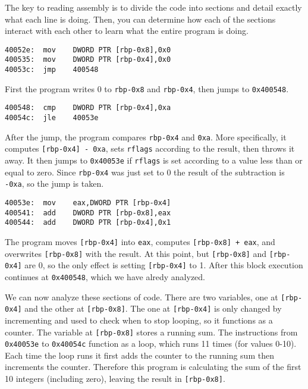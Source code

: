 The key to reading assembly is to divide the code into sections and detail
exactly what each line is doing. Then, you can determine how each of the
sections interact with each other to learn what the entire program is doing.

\begin{lstlisting}
40052e:  mov    DWORD PTR [rbp-0x8],0x0
400535:  mov    DWORD PTR [rbp-0x4],0x0
40053c:  jmp    400548
\end{lstlisting}

First the program writes 0 to \texttt{rbp-0x8} and \texttt{rbp-0x4}, then jumps
to \texttt{0x400548}.

\begin{lstlisting}
400548:  cmp    DWORD PTR [rbp-0x4],0xa
40054c:  jle    40053e
\end{lstlisting}

After the jump, the program compares \texttt{rbp-0x4} and \texttt{0xa}. More
specifically, it computes \texttt{[rbp-0x4] - 0xa}, sets \texttt{rflags}
according to the result, then throws it away. It then jumps to \texttt{0x40053e}
if \texttt{rflags} is set according to a value less than or equal to zero.
Since \texttt{rbp-0x4} was just set to 0 the result of the subtraction is
\texttt{-0xa}, so the jump is taken.

\begin{lstlisting}
40053e:  mov    eax,DWORD PTR [rbp-0x4]
400541:  add    DWORD PTR [rbp-0x8],eax
400544:  add    DWORD PTR [rbp-0x4],0x1
\end{lstlisting}

The program moves \texttt{[rbp-0x4]} into \texttt{eax}, computes
\texttt{[rbp-0x8] + eax}, and overwrites \texttt{[rbp-0x8]} with the result. At
this point, but \texttt{[rbp-0x8]} and \texttt{[rbp-0x4]} are 0, so the only
effect is setting \texttt{[rbp-0x4]} to 1. After this block execution continues
at \texttt{0x400548}, which we have alredy analyzed.

We can now analyze these sections of code. There are two variables, one at
\texttt{[rbp-0x4]} and the other at \texttt{[rbp-0x8]}. The one at
\texttt{[rbp-0x4]} is only changed by incrementing and used to check when to
stop looping, so it functions as a counter. The variable at \texttt{[rbp-0x8]}
stores a running sum. The instructions from \texttt{0x40053e} to
\texttt{0x40054c} function as a loop, which runs 11 times (for values 0-10).
Each time the loop runs it first adds the counter to the running sum then
increments the counter. Therefore this program is calculating the sum of the
first 10 integers (including zero), leaving the result in \texttt{[rbp-0x8]}.

